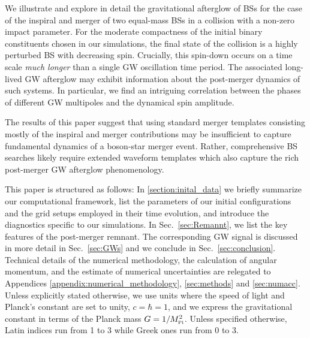 \documentclass[aps,twocolumn,nofootinbib,superscriptaddress,amsfonts,floatfix
]{revtex4-1} %
\newcommand{\mpl}{M_{\mbox{\tiny Pl}}}
\begin{document}
We illustrate and explore in detail the gravitational afterglow
of BSs for the case of the inspiral and merger 
of two equal-mass BSs in a collision with a non-zero impact parameter. For the moderate compactness of the initial binary constituents chosen in our simulations, the final state of the collision
is a highly perturbed BS with decreasing spin. Crucially, this spin-down occurs on a time scale {\it much longer} than a single GW oscillation time period.  The associated long-lived GW afterglow may exhibit information about the post-merger dynamics of such systems. In particular, we find an intriguing correlation between the phases of different GW multipoles and the dynamical spin amplitude. 

The results of this paper suggest that using standard merger templates consisting mostly of the inspiral and merger contributions may be insufficient to capture fundamental dynamics of a boson-star merger event. Rather, comprehensive BS searches likely require extended waveform templates which also capture the rich post-merger GW afterglow phenomenology.

This paper is structured as follows: In \cref{section:inital_data} we 
briefly summarize our computational framework, list the parameters
of our initial configurations and the grid setups employed in their
time evolution, and introduce the diagnostics specific
to our simulations. In Sec.~\ref{sec:Remannt},
we list the key features of the post-merger
remnant. The corresponding GW signal is discussed in more detail
in Sec.~\ref{sec:GWs} and we conclude in Sec.~\ref{sec:conclusion}.
Technical details of the numerical methodology, the calculation
of angular momentum, and the estimate of numerical uncertainties
are relegated to Appendices \ref{appendix:numerical_methodology},
\ref{sec:methods} and \ref{sec:numacc}.
Unless explicitly stated otherwise,
we use units where the speed of light and
Planck's constant are set to unity, $c=\hbar=1$, and we express the gravitational constant in terms of the Planck mass $G = 1/\mpl^2$. Unless specified otherwise, Latin indices run from 1 to 3 while Greek ones run from 0 to 3.
\end{document}
